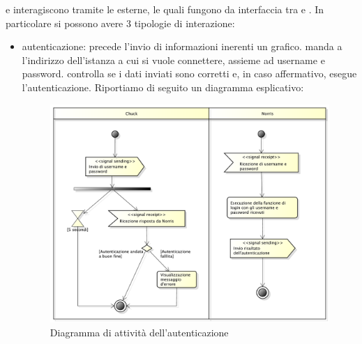         
         e  interagiscono tramite le  esterne, le quali fungono da interfaccia tra  e . In particolare si possono avere 3 tipologie di interazione:
        \begin{itemize}
            \item autenticazione: precede l'invio di informazioni inerenti un grafico.  manda a  l'indirizzo dell'istanza a cui si vuole connettere, assieme ad username e password.  controlla se i dati inviati sono corretti e, in caso affermativo, esegue l'autenticazione. Riportiamo di seguito un diagramma esplicativo:
        	\begin{figure}[H]\centering
        		\includegraphics[width=\textwidth]{SpecificaTecnica/Pics/Chuck/Autenticazione.pdf}
        		\caption{Diagramma di attività dell'autenticazione}
    		\end{figure}
	

\end{itemize}
